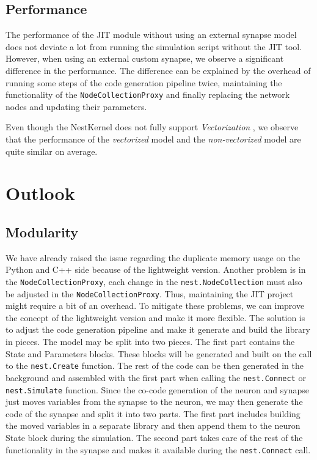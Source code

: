 \subsection*{Performance}

The performance of the JIT module without using an external synapse model does not deviate a lot from running the simulation script without the JIT tool. However, when using an external custom synapse, we observe a significant difference in the performance. The difference can be explained by the overhead of running some steps of the code generation pipeline twice, maintaining the functionality of the \texttt{NodeCollectionProxy} and finally replacing the network nodes and updating their parameters.

Even though the NestKernel does not fully support \emph{Vectorization} , we observe that the performance of the \emph{vectorized} model and the \emph{non-vectorized} model are quite similar on average.

\section{Outlook}

\subsection*{Modularity}

We have already raised the issue regarding the duplicate memory usage on the Python and C++ side because of the lightweight version. Another problem is in the \texttt{NodeCollectionProxy}, each change in the \texttt{nest.NodeCollection} must also be adjusted in the \texttt{NodeCollectionProxy}. Thus, maintaining the JIT project might require a bit of an overhead. To mitigate these problems, we can improve the concept of the lightweight version and make it more flexible. The solution is to adjust the code generation pipeline and make it generate and build the library in pieces. The model may be split into two pieces. The first part contains the State and Parameters blocks. These blocks will be generated and built on the call to the \texttt{nest.Create} function. The rest of the code can be then generated in the background and assembled with the first part when calling the \texttt{nest.Connect} or \texttt{nest.Simulate} function. Since the co-code generation of the neuron and synapse just moves variables from the synapse to the neuron, we may then generate the code of the synapse and split it into two parts. The first part includes building the moved variables in a separate library and then append them to the neuron State block during the simulation. The second part takes care of the rest of the functionality in the synapse and makes it available during the \texttt{nest.Connect} call.

